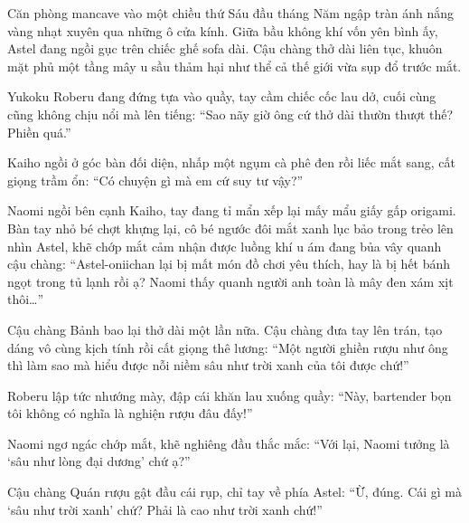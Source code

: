 \documentclass[../main.tex]{subfiles}
\begin{document}

Căn phòng mancave vào một chiều thứ Sáu đầu tháng Năm ngập tràn ánh nắng vàng nhạt xuyên qua những ô cửa kính. Giữa bầu không khí vốn yên bình ấy, Astel đang ngồi gục trên chiếc ghế sofa dài. Cậu chàng thở dài liên tục, khuôn mặt phủ một tầng mây u sầu thảm hại như thể cả thế giới vừa sụp đổ trước mắt.


Yukoku Roberu đang đứng tựa vào quầy, tay cầm chiếc cốc lau dở, cuối cùng cũng không chịu nổi mà lên tiếng: ``Sao nãy giờ ông cứ thở dài thườn thượt thế? Phiền quá.''

Kaiho ngồi ở góc bàn đối diện, nhấp một ngụm cà phê đen rồi liếc mắt sang, cất giọng trầm ổn: ``Có chuyện gì mà em cứ suy tư vậy?''

Naomi ngồi bên cạnh Kaiho, tay đang tỉ mẩn xếp lại mấy mẩu giấy gấp origami. Bàn tay nhỏ bé chợt khựng lại, cô bé ngước đôi mắt xanh lục bảo trong trẻo lên nhìn Astel, khẽ chớp mắt cảm nhận được luồng khí u ám đang bủa vây quanh cậu chàng: ``Astel-oniichan lại bị mất món đồ chơi yêu thích, hay là bị hết bánh ngọt trong tủ lạnh rồi ạ? Naomi thấy quanh người anh toàn là mây đen xám xịt thôi\dots''

Cậu chàng Bảnh bao lại thở dài một lần nữa. Cậu chàng đưa tay lên trán, tạo dáng vô cùng kịch tính rồi cất giọng thê lương: ``Một người ghiền rượu như ông thì làm sao mà hiểu được nỗi niềm sâu như trời xanh của tôi được chứ!''

Roberu lập tức nhướng mày, đập cái khăn lau xuống quầy: ``Này, bartender bọn tôi không có nghĩa là nghiện rượu đâu đấy!''

Naomi ngơ ngác chớp mắt, khẽ nghiêng đầu thắc mắc: ``Với lại, Naomi tưởng là `sâu như lòng đại dương' chứ ạ?''

Cậu chàng Quán rượu gật đầu cái rụp, chỉ tay về phía Astel: ``Ừ, đúng. Cái gì mà `sâu như trời xanh' chứ? Phải là cao như trời xanh chứ!''
\end{document}
